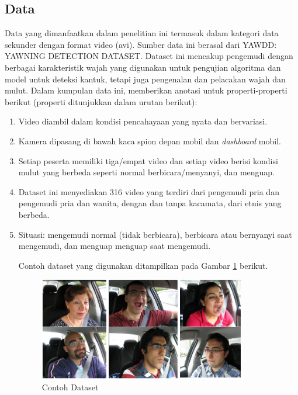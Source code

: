     
\subsection{Data}

    Data yang dimanfaatkan dalam penelitian ini termasuk dalam kategori data sekunder dengan format video (avi). Sumber data ini berasal dari YAWDD: YAWNING DETECTION DATASET. Dataset ini mencakup pengemudi dengan berbagai karakteristik wajah yang digunakan untuk pengujian algoritma dan model untuk deteksi kantuk, tetapi juga pengenalan dan pelacakan wajah dan 
    mulut. Dalam kumpulan data ini, memberikan anotasi untuk properti-properti berikut (properti ditunjukkan dalam urutan berikut):


    \begin{enumerate}

        \item Video diambil dalam kondisi pencahayaan yang nyata dan bervariasi.
        \item Kamera dipasang di bawah kaca spion depan mobil dan \textit{dashboard} mobil. 
        \item  Setiap peserta memiliki tiga/empat video dan setiap video berisi kondisi mulut yang berbeda seperti normal berbicara/menyanyi, dan menguap. 
        \item Dataset ini menyediakan 316 video yang terdiri dari pengemudi pria dan 
        pengemudi pria dan wanita, dengan dan tanpa kacamata, dari etnis yang berbeda.
        \item Situasi: mengemudi normal (tidak berbicara), berbicara atau bernyanyi saat mengemudi, dan menguap menguap saat mengemudi.



    Contoh dataset yang digunakan ditampilkan pada Gambar \ref{Contoh Dataset} berikut.

    \begin{figure}[H]
        \centering
        \includegraphics[width=0.85\textwidth]{figures/bab3/image.png}
        \caption{Contoh Dataset}
        \label{Contoh Dataset}
    \end{figure}

        
    
    \end{enumerate}
    
